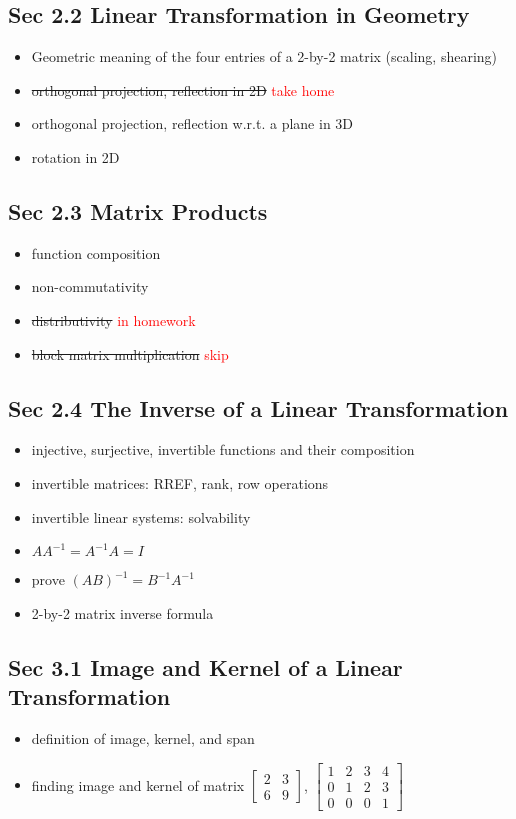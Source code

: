 \documentclass[12pt,a4paper]{article}
\newcommand{\red}[1]{\textcolor{red}{#1}}
\renewcommand{\l}{\left}
\renewcommand{\r}{\right}
\begin{document}
\subsection*{Sec 2.2 Linear Transformation in Geometry}
\begin{itemize}
    \item Geometric meaning of the four entries of a 2-by-2 matrix (scaling, shearing)
    \item \st{orthogonal projection, reflection in 2D} \red{take home}
    \item orthogonal projection, reflection w.r.t. a plane in 3D
    \item rotation in 2D
\end{itemize}

\subsection*{Sec 2.3 Matrix Products}
\begin{itemize}
    \item function composition
    \item non-commutativity
    \item \st{distributivity} \red{in homework}
    \item \st{block matrix multiplication} \red{skip}
\end{itemize}

\subsection*{Sec 2.4 The Inverse of a Linear Transformation}
\begin{itemize}
    \item injective, surjective, invertible functions and their composition
    \item invertible matrices: RREF, rank, row operations
    \item invertible linear systems: solvability
    \item $AA^{-1} = A^{-1}A = I$
    \item prove $(AB)^{-1} = B^{-1}A^{-1}$
    \item 2-by-2 matrix inverse formula
\end{itemize}

\subsection*{Sec 3.1 Image and Kernel of a Linear Transformation}
\begin{itemize}
    \item definition of image, kernel, and span
    \item finding image and kernel of matrix 
	$\l[
	\begin{array}{cc}
	    2 & 3 \\
	    6 & 9
	\end{array}
	\r]$,
	$\l[
	\begin{array}{cccc}
	    1&2&3&4 \\
	    0&1&2&3\\
	    0&0&0&1
	\end{array}
	\r]$
\end{itemize} 
\end{document}
